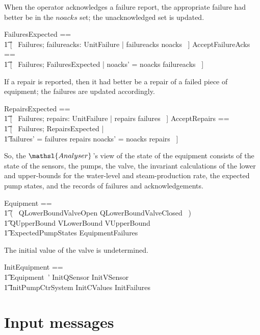 \documentclass{report}
\begin{document}
When the operator acknowledges a failure report, the appropriate
failure had better be in the \( noacks \)\/ set; the unacknowledged
set is updated.
\begin{zed}
  FailuresExpected ==
  \\ %
  \t1 [~ Failures; failureacks: \power UnitFailure | failureacks
  \subseteq noacks ~]
  \also %
  AcceptFailureAcks ==
  \\ %
  \t1 [~ \Delta Failures; FailuresExpected | noacks' = noacks
  \setminus failureacks ~]
\end{zed}
If a repair is reported, then it had better be a repair of a failed
piece of equipment; the failures are updated accordingly.
\begin{zed}
  RepairsExpected ==
  \\ %
  \t1 [~ Failures; repairs: \power UnitFailure | repairs
  \subseteq failures ~]
  \also %
  AcceptRepairs ==
  \\ %
  \t1
    [~ \Delta Failures; RepairsExpected | %
    \\ %
    \t1 failures' = failures \setminus repairs \land noacks' = noacks
    \setminus repairs ~]
\end{zed}

So, the \( \mathsl{Analyser} \, \)'s view of the state of the
equipment consists of the state of the sensors, the pumps, the valve,
the invariant calculations of the lower and upper-bounds for the
water-level and steam-production rate, the expected pump states, and
the records of failures and acknowledgements.
\begin{zed}
  Equipment ==
  \\ %
  \t1
    (~ QLowerBoundValveOpen \lor QLowerBoundValveClosed ~) \land {} %
    \\ \t1 %
    QUpperBound \land VLowerBound \land VUpperBound \land {}
    \\ \t1 %
    ExpectedPumpStates \land EquipmentFailures
\end{zed}
The initial value of the  valve is undetermined.
\begin{zed}
  InitEquipment ==
  \\ %
  \t1
    Equipment~' \land InitQSensor \land InitVSensor \land {} %
    \\ \t1 %
    InitPumpCtrSystem \land InitCValues \land InitFailures
\end{zed}

\section{Input messages}
\end{document}

